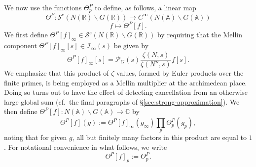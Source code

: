 We now use the functions $\Theta^P_p$ to define, as follows, a linear map
\begin{equation*}
  \Theta^P : \mathcal{S}^e(N(\mathbb{R}) \backslash G(\mathbb{R})) \rightarrow C^\infty(N(\mathbb{A}) \backslash G(\mathbb{A}))
\end{equation*}
\begin{equation*}
  f \mapsto \Theta^P[f].
\end{equation*}
We first define $\Theta^P[f]_\infty \in \mathcal{S}^e(N(\mathbb{R}) \backslash G(\mathbb{R}))$ by requiring that the Mellin component $\Theta^P[f]_\infty [s] \in \mathcal{I}_\infty(s)$ be given by
\begin{equation*}
  \Theta^P[f]_\infty [s] = \mathcal{P}_G(s) \frac{\zeta(N,s)}{\zeta(N'', s)} f[s].
\end{equation*}
We emphasize that this product of $\zeta$ values, formed by Euler products over the finite primes, is being employed as a Mellin multiplier at the archimedean place.  Doing so turns out to have the effect of detecting cancellation from an otherwise large global sum (cf.\ the final paragraphs of \S\ref{sec:strong-approximation}).  We then define $\Theta^P[f] : N(\mathbb{A}) \backslash G(\mathbb{A}) \rightarrow \mathbb{C}$ by 
\begin{equation*}
  \Theta^P[f](g) := \Theta^P[f]_{\infty}(g_\infty) \prod_p \Theta^P_p (g_{p}),
\end{equation*}
noting that for given $g$, all but finitely many factors in this product are equal to $1$.  For notational convenience in what follows, we write
\begin{equation*}
  \Theta^P[f]_p := \Theta_p^P.
\end{equation*}


